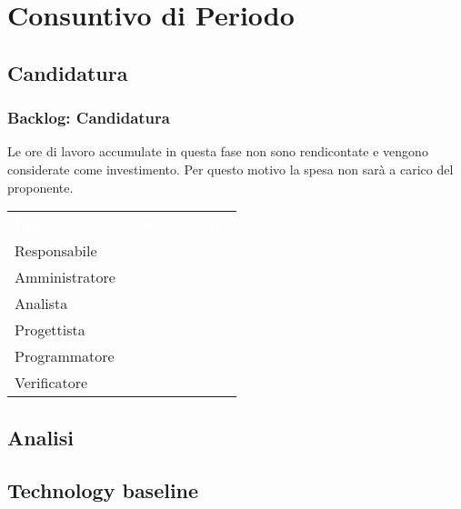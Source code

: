 \section{Consuntivo di Periodo}
\subsection{Candidatura}
\subsubsection{Backlog: Candidatura}
Le ore di lavoro accumulate in questa fase non sono rendicontate e vengono considerate come investimento. Per questo motivo la spesa non sarà a carico del proponente.
{\renewcommand{\arraystretch}{1.5}
\begin{longtable}{p{0.20\linewidth}p{0.15\linewidth}p{0.15\linewidth}}
	\rowcolor[RGB]{33, 73, 50}
	\textcolor{white}{\textbf{Ruolo}} & \textcolor{white}{\textbf{Ore}} & \textcolor{white}{\textbf{Costo}}\\
    \rowcolor[RGB]{216, 235, 171}
    Responsabile &  & \\
    
    \rowcolor[RGB]{233, 245, 206}
    Amministratore & & \\

    \rowcolor[RGB]{216, 235, 171}
    Analista & & \\

    \rowcolor[RGB]{233, 245, 206}
    Progettista & &\\

    \rowcolor[RGB]{216, 235, 171}
    Programmatore & &\\

    \rowcolor[RGB]{233, 245, 206}
    Verificatore & &\\
    
\end{longtable}	
}

\subsection{Analisi}

\subsection{Technology baseline}